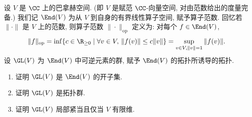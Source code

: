 \begin{exercise}[$GL(V)$ 的拓扑]
\label{ex:I.5.1.1}
设 $V$ 是 $\CC$ 上的巴拿赫空间. (即 $V$ 是赋范 $\CC$-向量空间, 对由范数给出的度量完备.) 我们记 $\End(V)$ 为从 $V$ 到自身的有界线性算子空间, 赋予算子范数. 回忆若 $\|\cdot\|$ 是 $V$ 上的范数, 则算子范数 $\|\cdot\|_{\mathrm{op}}$ 定义为: 对每个 $f \in \End(V)$,
\[
\|f\|_{\mathrm{op}} = \inf\{c \in \R_{\geq 0} \mid \forall v \in V,\, \|f(v)\| \leq c\|v\|\} = \sup_{v \in V, \|v\| = 1}\|f(v)\|.
\]
设 $\GL(V)$ 为 $\End(V)$ 中可逆元素的群, 赋予 $\End(V)$ 的拓扑所诱导的拓扑.
\begin{enumerate}
\item[(a)] 证明 $\GL(V)$ 是 $\End(V)$ 的开子集.
\item[(b)] 证明 $\GL(V)$ 是拓扑群.
\item[(c)] 证明 $\GL(V)$ 局部紧当且仅当 $V$ 有限维.
\end{enumerate}
\end{exercise}

